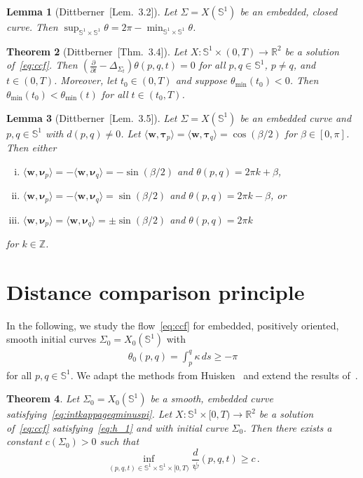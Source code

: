 \documentclass[reqno]{amsart}
\newtheorem{Thm}{Theorem}
\newtheorem{Lemma}[Thm]{Lemma}
\theoremstyle{definition}
\def\btau{\boldsymbol{\tau}}
\def\bw{\mathbf{w}}
\def\nnu{\boldsymbol{\nu}}
\def\pa{\partial}
\def\R{\mathbb{R}}
\def\Si{\Sigma}
\def\Sp{\Sph^1}
\def\Sph{\mathbb{S}}
\def\St{\Si_t}
\def\Z{\mathbb{Z}}
\newcommand{\fracp}[2]{{\frac{\pa #1}{\pa #2}}}
\begin{document}
\begin{Lemma}[Dittberner~{\cite{Dittberner21}[Lem.~3.2]}]\label{lem:minmaxtheta}
Let $\Si=X(\Sp)$ be an embedded, closed curve. 
Then $\sup_{\Sp\!\times\Sp}\theta=2\pi-\min_{\Sp\!\times\Sp}\theta$.
\end{Lemma}

\begin{Thm}[Dittberner~{\cite{Dittberner21}[Thm.~3.4]}]\label{thm:dtdstheta}
Let $X:\Sp\times(0,T)\to\R^2$ be a solution of~\eqref{eq:ccf}.
Then $(\fracp{}{t}-\Delta_{\St})\theta(p,q,t)=0$ for all $p,q\in\Sp$, $p\ne q$, and $t\in(0,T)$.
Moreover, let $t_0\in(0,T)$ and suppose $\theta_{\min}(t_0)<0$. 
Then $\theta_{\min}(t_0)<\theta_{\min}(t)$ for all $t\in(t_0,T)$.
\end{Thm}

\begin{Lemma}[Dittberner~{\cite{Dittberner21}[Lem.~3.5]}]\label{lem:thetabeta}
Let $\Si=X(\Sp)$ be an embedded curve and $p,q\in\Sp$ with $d(p,q)\ne0$.
Let $\langle\bw,\btau_p\rangle=\langle\bw,\btau_q\rangle=\cos(\beta/2)$ for $\beta\in[0,\pi]$.
Then either
\begin{enumerate}[(i)]
\item $\langle\bw,\nnu_p\rangle=-\langle\bw,\nnu_q\rangle=-\sin(\beta/2)$ and $\theta(p,q)=2\pi k+\beta$,
\item $\langle\bw,\nnu_p\rangle=-\langle\bw,\nnu_q\rangle=\sin(\beta/2)$ and $\theta(p,q)=2\pi k-\beta$, or
\item $\langle\bw,\nnu_p\rangle=\langle\bw,\nnu_q\rangle=\pm\sin(\beta/2)$ and $\theta(p,q)=2\pi k$
\end{enumerate}
for $k\in\Z$.
\end{Lemma}


\section{Distance comparison principle}

In the following, we study the flow~\eqref{eq:ccf} for embedded, positively oriented, smooth initial curves $\Si_0=X_0(\Sp)$ with
\begin{align}\label{eq:intkappageqminuspi}
\theta_0(p,q)=\int_p^q\kappa\,ds\geq-\pi
\end{align}
for all $p,q\in\Sp$. 
We adapt the methods from Huisken~\cite{Huisken95} and extend the results of~\cite{Dittberner21}.

\begin{Thm}
\label{thm:minimumdpsi}
Let $\Si_0=X_0(\Sp)$ be a smooth, embedded curve satisfying~\eqref{eq:intkappageqminuspi}. 
Let $X:\Sp\!\times[0,T)\to\R^2$ be a solution of~\eqref{eq:ccf} satisfying~\eqref{eq:h_1} and with initial curve $\Si_0$.
Then there exists a constant $c(\Si_0)>0$ such that
$$\inf_{(p,q,t)\in\Sp\!\times\Sp\!\times[0,T)}\frac d\psi(p,q,t)\geq c\,.$$
\end{Thm}
\end{document}
